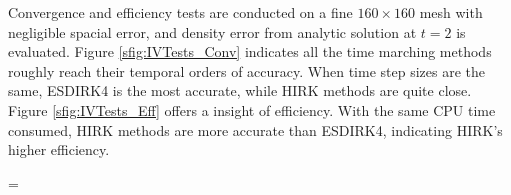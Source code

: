 \documentclass[10pt]{article}
\begin{document}
Convergence and efficiency tests are conducted on a fine $160\times160$ mesh with
negligible spacial error, and density error from analytic solution at $t=2$ is evaluated.
Figure \ref{sfig:IVTests_Conv} indicates all the time marching methods
roughly reach their temporal orders of accuracy. When time step sizes are
the same, ESDIRK4 is the most accurate, while HIRK methods are
quite close.
Figure \ref{sfig:IVTests_Eff} offers a insight of efficiency. With
the same CPU time consumed, HIRK methods are more accurate than
ESDIRK4, indicating HIRK's higher efficiency.




\bibspacing=


\end{document}
